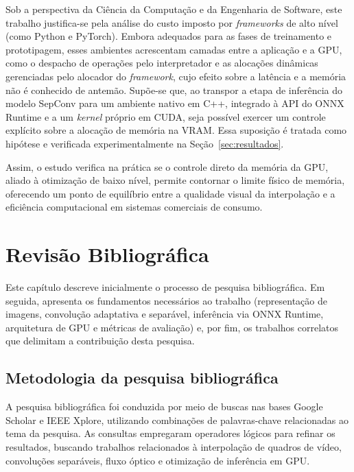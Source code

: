 \documentclass[
    12pt,                %
    openright,           %
    oneside,             %
    a4paper,             %
    english,             %
    brazil               %
]{abntex2}
\begin{document}
Sob a perspectiva da Ciência da Computação e da Engenharia de Software, este trabalho justifica-se pela análise do custo imposto por \textit{frameworks} de alto nível (como Python e PyTorch). Embora adequados para as fases de treinamento e prototipagem, esses ambientes acrescentam camadas entre a aplicação e a GPU, como o despacho de operações pelo interpretador e as alocações dinâmicas gerenciadas pelo alocador do \textit{framework}, cujo efeito sobre a latência e a memória não é conhecido de antemão. Supõe-se que, ao transpor a etapa de inferência do modelo SepConv para um ambiente nativo em C++, integrado à API do ONNX Runtime e a um \textit{kernel} próprio em CUDA, seja possível exercer um controle explícito sobre a alocação de memória na VRAM. Essa suposição é tratada como hipótese e verificada experimentalmente na Seção~\ref{sec:resultados}.

Assim, o estudo verifica na prática se o controle direto da memória da GPU, aliado à otimização de baixo nível, permite contornar o limite físico de memória, oferecendo um ponto de equilíbrio entre a qualidade visual da interpolação e a eficiência computacional em sistemas comerciais de consumo.

\chapter{Revisão Bibliográfica}
\label{cap:revisao}

Este capítulo descreve inicialmente o processo de pesquisa bibliográfica. Em seguida, apresenta os fundamentos necessários ao trabalho (representação de imagens, convolução adaptativa e separável, inferência via ONNX Runtime, arquitetura de GPU e métricas de avaliação) e, por fim, os trabalhos correlatos que delimitam a contribuição desta pesquisa.

\section{Metodologia da pesquisa bibliográfica}
\label{sec:metodologia_pesquisa}

A pesquisa bibliográfica foi conduzida por meio de buscas nas bases Google Scholar e IEEE Xplore, utilizando combinações de palavras-chave relacionadas ao tema da pesquisa. As consultas empregaram operadores lógicos para refinar os resultados, buscando trabalhos relacionados à interpolação de quadros de vídeo, convoluções separáveis, fluxo óptico e otimização de inferência em GPU.
\end{document}
